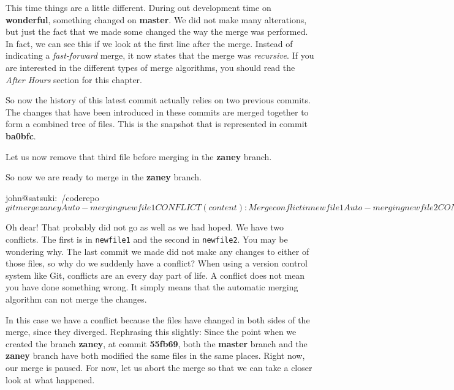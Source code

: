 This time things are a little different.
During out development time on \textbf{wonderful}, something changed on \textbf{master}.
We did not make many alterations, but just the fact that we made some changed the way the merge was performed.
In fact, we can see this if we look at the first line after the merge.
Instead of indicating a \emph{fast-forward} merge, it now states that the merge was \emph{recursive}.
If you are interested in the different types of merge algorithms, you should read the \emph{After Hours} section for this chapter.

So now the history of this latest commit actually relies on two previous commits.
The changes that have been introduced in these commits are merged together to form a combined tree of files.
This is the snapshot that is represented in commit \textbf{ba0bfc}.

Let us now remove that third file before merging in the \textbf{zaney} branch.


So now we are ready to merge in the \textbf{zaney} branch.

\begin{code}
john@satsuki:~/coderepo$ git merge zaney
Auto-merging newfile1
CONFLICT (content): Merge conflict in newfile1
Auto-merging newfile2
CONFLICT (content): Merge conflict in newfile2
Automatic merge failed; fix conflicts and then commit the result.
john@satsuki:~/coderepo$
\end{code}

Oh dear! That probably did not go as well as we had hoped.
We have two conflicts.
The first is in \texttt{newfile1} and the second in \texttt{newfile2}.
You may be wondering why.
The last commit we made did not make any changes to either of those files, so why do we suddenly have a conflict? When using a version control system like Git, conflicts are an every day part of life.
A conflict does not mean you have done something wrong.
It simply means that the automatic merging algorithm can not merge the changes.

In this case we have a conflict because the files have changed in both sides of the merge, since they diverged.
Rephrasing this slightly: Since the point when we created the branch \textbf{zaney}, at commit \textbf{55fb69}, both the \textbf{master} branch and the \textbf{zaney} branch have both modified the same files in the same places.
Right now, our merge is paused.
For now, let us abort the merge so that we can take a closer look at what happened.

